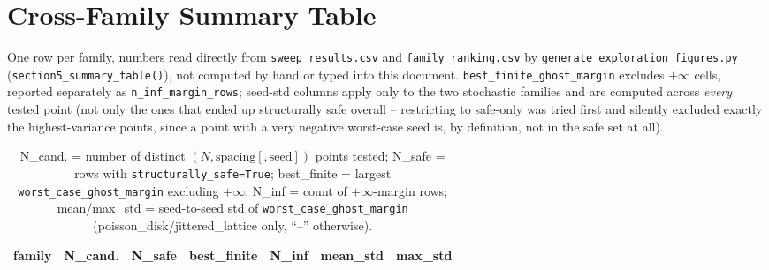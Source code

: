 \documentclass[11pt]{report}
\begin{document}
\chapter{Cross-Family Summary Table}
One row per family, numbers read directly from \texttt{sweep\_results.csv} and
\texttt{family\_ranking.csv} by \texttt{generate\_exploration\_figures.py}
(\texttt{section5\_summary\_table()}), not computed by hand or typed into this document.
\texttt{best\_finite\_ghost\_margin} excludes $+\infty$ cells, reported separately as
\texttt{n\_inf\_margin\_rows}; seed-std columns apply only to the two stochastic families
and are computed across \emph{every} tested point (not only the ones that ended up
structurally safe overall -- restricting to safe-only was tried first and silently
excluded exactly the highest-variance points, since a point with a very negative
worst-case seed is, by definition, not in the safe set at all).

\begin{table}[h!]
\centering\small
\begin{tabular}{lrrrrrr}
\toprule
\textbf{family} & \textbf{N\_cand.} & \textbf{N\_safe} & \textbf{best\_finite} &
\textbf{N\_inf} & \textbf{mean\_std} & \textbf{max\_std} \\
\midrule

\end{tabular}
\caption{N\_cand. = number of distinct $(N,\text{spacing}[,\text{seed}])$ points tested;
N\_safe = rows with \texttt{structurally\_safe=True}; best\_finite =
largest \texttt{worst\_case\_ghost\_margin} excluding $+\infty$; N\_inf = count of
$+\infty$-margin rows; mean/max\_std = seed-to-seed std of \texttt{worst\_case\_ghost\_margin}
(poisson\_disk/jittered\_lattice only, ``--'' otherwise).}
\end{table}
\end{document}

